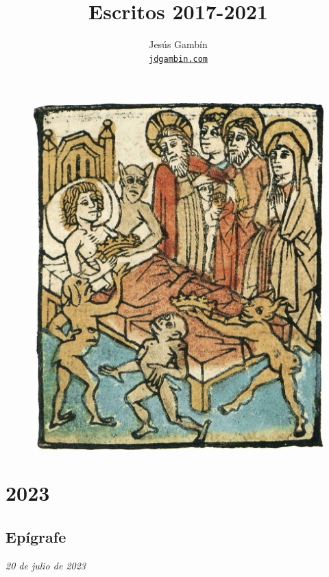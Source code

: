 \documentclass[12pt]{article}
\title
{
	Escritos 2017-2021\\\vspace{0.5cm}
}
\author
{
	Jesús Gambín\\
	\normalsize{
		\texttt{\href{https://jdgambin.github.io}{jdgambin.com}}
	}
	\\\vspace{-1cm}
}
\date{}
\begin{document}
	\maketitle

	\begin{figure}[ht]
		\centering
		\includegraphics[scale=1]{portada}
	\end{figure}

	\vspace{0.8cm}

	\newpage

	\tableofcontents

	\newpage

	\section{2023}

	\subsection{Epígrafe}

	\textit{20 de julio de 2023}\\
\end{document}

